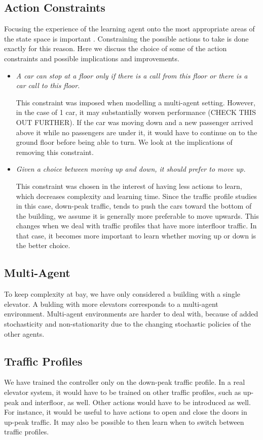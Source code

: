 \subsection{Action Constraints}

Focusing the experience of the learning agent onto the most appropriate areas of the state space is important \cite{barto.bradt-1995}. Constraining the possible actions to take is done exactly for this reason. Here we discuss the choice of some of the action constraints and possible implications and improvements.

\begin{itemize}
    \item \textit{A car can stop at a floor only if there is a call from this floor or there
    is a car call to this floor.}

    This constraint was imposed when modelling a multi-agent setting. However, in the case of 1 car, it may substantially worsen performance {\color{red}(CHECK THIS OUT FURTHER)}. If the car was moving down and a new passenger arrived above it while no passengers are under it, it would have to continue on to the ground floor before being able to turn. We look at the implications of removing this constraint.

    \item \textit{Given a choice between moving up and down, it should prefer to move up.}
    
    This constraint was chosen in the interest of having less actions to learn, which decreases complexity and learning time. Since the traffic profile studies in this case, down-peak traffic, tends to push the cars toward the bottom of the building, we assume it is generally more preferable to move upwards. This changes when we deal with traffic profiles that have more interfloor traffic. In that case, it becomes more important to learn whether moving up or down is the better choice.
\end{itemize}

\subsection{Multi-Agent}

To keep complexity at bay, we have only considered a building with a single elevator. A bulding with more elevators corresponds to a multi-agent environment. Multi-agent environments are harder to deal with, because of added stochasticity and non-stationarity due to the
changing stochastic policies of the other agents.

\subsection{Traffic Profiles}

We have trained the controller only on the down-peak traffic profile. In a real elevator system, it would have to be trained on other traffic profiles, such as up-peak and interfloor, as well. Other actions would have to be introduced as well. For instance, it would be useful to have actions to open and close the doors in up-peak traffic. It may also be possible to then learn when to switch between traffic profiles. 
